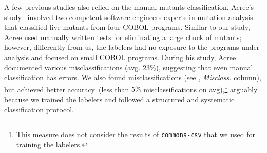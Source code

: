 \documentclass[sigconf,review,anonymous]{acmart}
\begin{document}
A few previous studies also relied on the manual mutants classification.
%
Acree's study~\cite{acree1980mutation} 
involved two competent software engineers experts in mutation analysis
that classified
live mutants from four COBOL programs.
Similar to our study, Acree used manually written tests
for eliminating a large chuck of mutants; however, differently 
from us, the labelers had no exposure to the programs under analysis and
focused on small COBOL programs.
%
During his study, Acree documented various misclassifications (avg. 23\%),
suggesting that even manual classification has errors. 
%
We also found misclassifications (see , \emph{Misclass.} column),
but achieved better accuracy~(less than $5\%$ misclassifications on avg),\footnote{This measure does not consider the results of \texttt{commons-csv} that we used for training the labelers.}
arguably because we trained the labelers
and followed a structured and systematic classification protocol.
\end{document}
